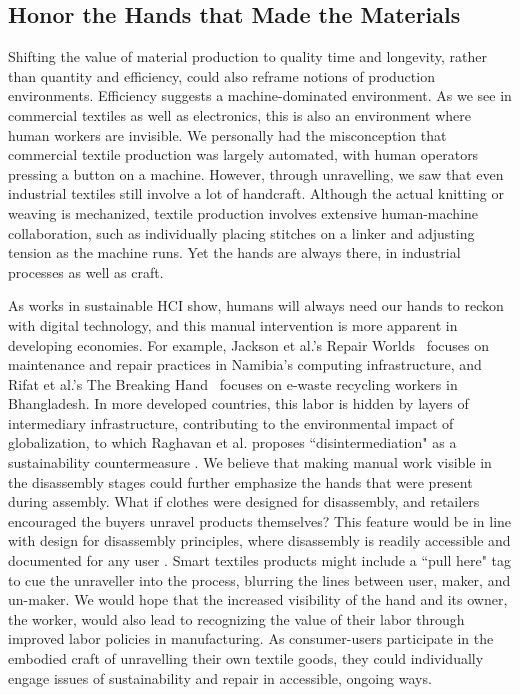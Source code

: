 \documentclass{sigchi}
\begin{document}
\subsection{Honor the Hands that Made the Materials}

Shifting the value of material production to quality time and longevity, rather than quantity and efficiency, could also reframe notions of production environments. Efficiency suggests a machine-dominated environment. As we see in commercial textiles as well as electronics, this is also an environment where human workers are invisible. We personally had the misconception that commercial textile production was largely automated, with human operators pressing a button on a machine. However, through unravelling, we saw that even industrial textiles still involve a lot of handcraft. Although the actual knitting or weaving is mechanized, textile production involves extensive human-machine collaboration, such as individually placing stitches on a linker and adjusting tension as the machine runs. \cite{engineers_complete_2017} Yet the hands are always there, in industrial processes as well as craft. 

As works in sustainable HCI show, humans will always need our hands to reckon with digital technology, and this manual intervention is more apparent in developing economies. For example, Jackson et al.'s Repair Worlds~\cite{jackson_repair_2012} focuses on maintenance and repair practices in Namibia's computing infrastructure, and Rifat et al.'s The Breaking Hand~\cite{rifat_breaking_2019} focuses on e-waste recycling workers in Bhangladesh. In more developed countries, this labor is hidden by layers of intermediary infrastructure, contributing to the environmental impact of globalization, to which Raghavan et al. proposes ``disintermediation" as a sustainability countermeasure \cite{raghavan_means_2017}. We believe that making manual work visible in the disassembly stages could further emphasize the hands that were present during assembly. What if clothes were designed for disassembly, and retailers encouraged the buyers unravel products themselves? This feature would be in line with design for disassembly principles, where disassembly is readily accessible and documented for any user \cite{webster_dfd}. Smart textiles products might include a ``pull here" tag to cue the unraveller into the process, blurring the lines between user, maker, and un-maker. We would hope that the increased visibility of the hand and its owner, the worker, would also lead to recognizing the value of their labor through improved labor policies in manufacturing. As consumer-users participate in the embodied craft of unravelling their own textile goods, they could individually engage issues of sustainability and repair in accessible, ongoing ways.
\end{document}
